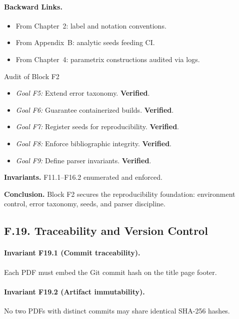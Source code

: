 \paragraph{Backward Links.}
\begin{itemize}
  \item From Chapter~2: label and notation conventions.
  \item From Appendix~B: analytic seeds feeding CI.
  \item From Chapter~4: parametrix constructions audited via logs.
\end{itemize}

\begin{auditblock}{Audit of Block F2}
\leavevmode
\begin{itemize}
  \item \emph{Goal F5:} Extend error taxonomy. \textbf{Verified}.
  \item \emph{Goal F6:} Guarantee containerized builds. \textbf{Verified}.
  \item \emph{Goal F7:} Register seeds for reproducibility. \textbf{Verified}.
  \item \emph{Goal F8:} Enforce bibliographic integrity. \textbf{Verified}.
  \item \emph{Goal F9:} Define parser invariants. \textbf{Verified}.
\end{itemize}

\textbf{Invariants.}
F11.1–F16.2 enumerated and enforced.

\textbf{Conclusion.}
Block F2 secures the reproducibility foundation: environment control,
error taxonomy, seeds, and parser discipline.
\end{auditblock}

\subsection*{F.19. Traceability and Version Control}

\paragraph{Invariant F19.1 (Commit traceability).}
Each PDF must embed the Git commit hash on the title page footer.

\paragraph{Invariant F19.2 (Artifact immutability).}
No two PDFs with distinct commits may share identical SHA-256 hashes.

